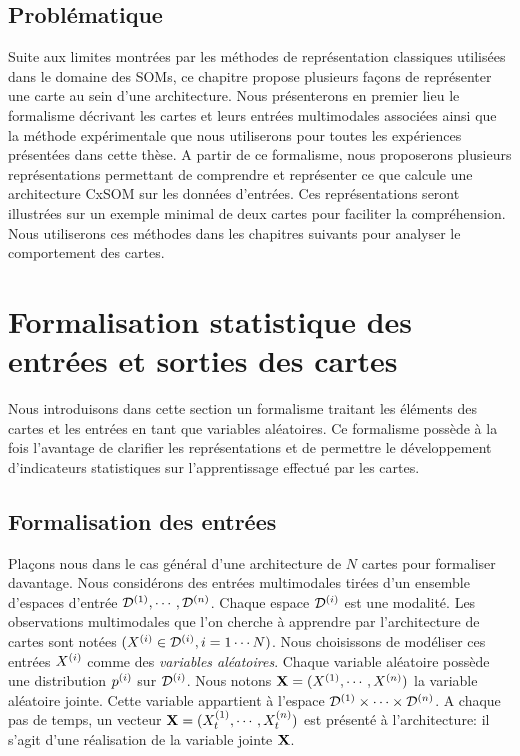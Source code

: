 \documentclass[../main]{subfiles}
\begin{document}
\subsection{Problématique}

Suite aux limites montrées par les méthodes de représentation classiques utilisées dans le domaine des SOMs, ce chapitre propose plusieurs façons de représenter une carte au sein d'une architecture.
Nous présenterons en premier lieu le formalisme décrivant les cartes et leurs entrées multimodales associées ainsi que la méthode expérimentale que nous utiliserons pour toutes les expériences présentées dans cette thèse. A partir de ce formalisme, nous proposerons plusieurs représentations permettant de comprendre et représenter ce que calcule une architecture CxSOM sur les données d'entrées. Ces représentations seront illustrées sur un exemple minimal de deux cartes pour faciliter la compréhension. Nous utiliserons ces méthodes dans les chapitres suivants pour analyser le comportement des cartes.

\section{Formalisation statistique des entrées et sorties des cartes}

Nous introduisons dans cette section un formalisme traitant les éléments des cartes et les entrées en tant que variables aléatoires. 
Ce formalisme possède à la fois l'avantage de clarifier les représentations et de permettre le développement d'indicateurs statistiques sur l'apprentissage effectué par les cartes.

\subsection{Formalisation des entrées}

Plaçons nous dans le cas général d'une architecture de $N$ cartes pour formaliser davantage.
Nous considérons des entrées multimodales tirées d'un ensemble d'espaces d'entrée $\mathcal{D}^{({1})},\cdots,\mathcal{D}^{({n})}$. Chaque espace $\mathcal{D}^{({i})}$ est une modalité.
Les observations multimodales que l'on cherche à apprendre par l'architecture de cartes sont notées $(X^{({i})} \in \mathcal{D}^{({i})}, i = 1 \cdots N)$.
Nous choisissons de modéliser ces entrées $X^{({i})}$ comme des \emph{variables aléatoires}.
Chaque variable aléatoire possède une distribution $p^{({i})}$ sur $\mathcal{D}^{({i})}$.
Nous notons $\mathbf{X} = (X^{({1})}, \cdots, X^{({n})})$ la variable aléatoire jointe.
Cette variable appartient à l'espace $\mathcal{D}^{({1})} \times \cdots \times \mathcal{D}^{({n})}$.
A chaque pas de temps, un vecteur $\mathbf{X} = (X^{({1})}_t, \cdots , X^{({n})}_t)$ est présenté à l'architecture: il s'agit d'une réalisation de la variable jointe $\mathbf{X}$. 
\end{document}
